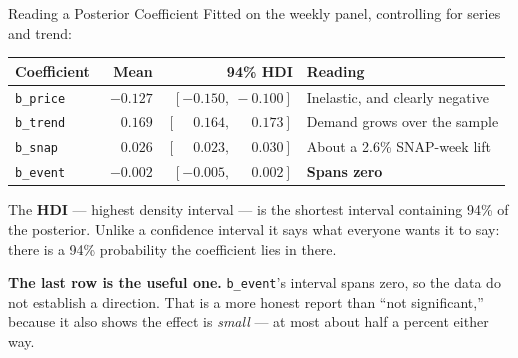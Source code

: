 \documentclass[aspectratio=169, 11pt]{beamer}
\begin{document}
\begin{frame}{Reading a Posterior Coefficient}
  Fitted on the weekly panel, controlling for series and trend:
  \begin{center}
    {\small
    \begin{tabular}{lrrl}
      \toprule
      \textbf{Coefficient} & \textbf{Mean} & \textbf{94\% HDI} & \textbf{Reading} \\
      \midrule
      \texttt{b\_price} & $-0.127$ & $[-0.150,\ -0.100]$ & Inelastic, and clearly negative \\
      \texttt{b\_trend} & $\phantom{-}0.169$ & $[\phantom{-}0.164,\ \phantom{-}0.173]$ & Demand grows over the sample \\
      \texttt{b\_snap} & $\phantom{-}0.026$ & $[\phantom{-}0.023,\ \phantom{-}0.030]$ & About a 2.6\% SNAP-week lift \\
      \texttt{b\_event} & $-0.002$ & $[-0.005,\ \phantom{-}0.002]$ & \textbf{Spans zero} \\
      \bottomrule
    \end{tabular}
    }
  \end{center}

  \vspace{-0.05cm}
  The \textbf{HDI} --- highest density interval --- is the shortest interval containing 94\% of
  the posterior. Unlike a confidence interval it says what everyone wants it to say: there is a
  94\% probability the coefficient lies in there.

  \vspace{0.15cm}
  \textbf{The last row is the useful one.} \texttt{b\_event}'s interval spans zero, so the data
  do not establish a direction. That is a more honest report than ``not significant,'' because it
  also shows the effect is \emph{small} --- at most about half a percent either way.
\end{frame}
\end{document}
